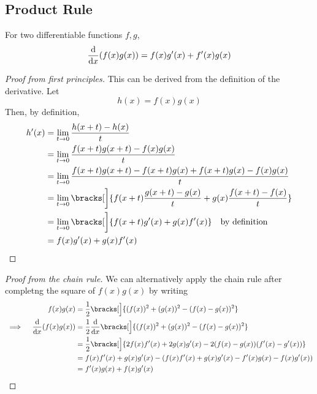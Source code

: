 \subsection{Product Rule} \label{sec_calc_product}

\begin{theorem}
 For two differentiable functions \(f, g\),
 \begin{equation*}
  \dv{x} (f(x)g(x)) = f(x)g'(x) + f'(x)g(x)
 \end{equation*}
\end{theorem}
\begin{proof}[Proof from first principles]
 This can be derived from the definition of the derivative. Let
 \begin{equation*}
  h(x) = f(x)g(x)
 \end{equation*}
 Then, by definition,
 \begin{align*}
  h'(x) &= \lim_{t \to 0} \frac{h(x + t) - h(x)} t \\
        &= \lim_{t \to 0} \frac{f(x + t)g(x + t) - f(x)g(x)} t \\
        &= \lim_{t \to 0} \frac{f(x + t)g(x + t) - f(x + t)g(x)
                              + f(x + t)g(x) - f(x)g(x)} t \\
        &= \lim_{t \to 0} \bracks[\bigg]{
            f(x + t) \frac{g(x + t) - g(x)} t
          + g(x) \frac{f(x + t) - f(x)} t} \\
        &= \lim_{t \to 0} \bracks[\bigg]{
            f(x + t)g'(x)
          + g(x) f'(x)} \quad \text{by definition} \\
        &= f(x)g'(x) + g(x)f'(x)
  \qedhere
 \end{align*}
\end{proof}
\begin{proof}[Proof from the chain rule]
 We can alternatively apply the chain rule after completng the square of
 \(f(x)g(x)\) by writing
 \begin{alignat*}{2}
  && f(x)g(x) &= \frac 12 \bracks[\Big]
                  {(f(x))^2 + (g(x))^2 - (f(x) - g(x))^2} \\
  &\implies{}& \dv{x} (f(x)g(x))
              &= \frac 12 \dv{x} \bracks[\Big]
                  {(f(x))^2 + (g(x))^2 - (f(x) - g(x))^2} \\
  &&          &= \frac 12 \bracks[\Big]
                  {2f(x)f'(x) + 2g(x)g'(x)
                 - 2(f(x) - g(x))(f'(x) - g'(x))} \\
  &&          &= f(x)f'(x) + g(x)g'(x)
               - (f(x)f'(x) + g(x)g'(x) - f'(x)g(x) - f(x)g'(x)) \\
  &&          &= f'(x)g(x) + f(x)g'(x) \qedhere
 \end{alignat*}
\end{proof}
